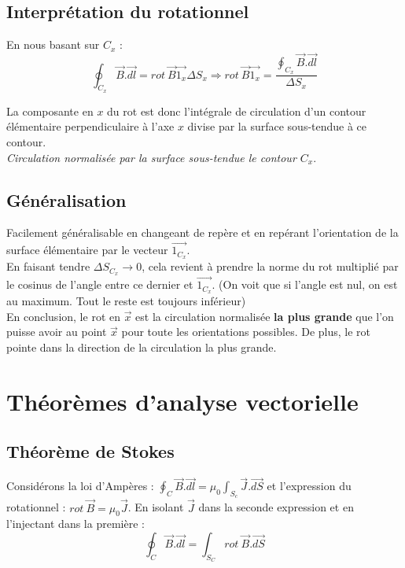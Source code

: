 \documentclass	[11pt, a4paper, openany]{book}
\begin{document}
\subsection{Interprétation du rotationnel}
En nous basant sur $C_x$ :
\begin{equation}
	\oint_{C_x} \vec{B}.\vec{dl} = rot\ \vec{B}\vec{1_x}\Delta S_x \Rightarrow rot\ \vec{B}\vec{1_x} = \frac{\oint_{C_x} \vec{B}.\vec{dl}}{\Delta S_x}
\end{equation}

La composante en $x$ du rot est donc l'intégrale de circulation d'un contour élémentaire perpendiculaire à l'axe $x$ divise par la surface sous-tendue à ce contour.\\
\textit{Circulation normalisée par la surface sous-tendue le contour $C_x$}.

\subsection{Généralisation }
Facilement généralisable en changeant de repère et en repérant l'orientation de la surface élémentaire par le vecteur $\vec{1_{C_x}}$.\\

En faisant tendre $\Delta S_{C_x} \rightarrow 0$, cela revient à prendre la norme du rot multiplié par le cosinus de l'angle entre ce dernier et $\vec{1_{C_x}}$. (On voit que si l'angle est nul, on est au maximum. Tout le reste est toujours inférieur)\\

En conclusion, le rot en $\vec{x}$ est la circulation normalisée \textbf{la plus grande} que l'on puisse avoir au point $\vec{x}$ pour toute les orientations possibles. De plus, le rot pointe dans la direction de la circulation la plus grande. 

\section{Théorèmes d'analyse vectorielle}
\subsection{Théorème de Stokes}
Considérons la loi d'Ampères : $\oint_C \vec{B}.\vec{dl} = \mu_0 \int_{S_c} \vec{J}.\vec{dS}$ et l'expression du rotationnel : $rot\ \vec{B} = \mu_0\vec{J}$. En isolant $\vec{J}$ dans la seconde expression et en l'injectant dans la première :
\begin{equation}
	\oint_C \vec{B}.\vec{dl} = \int_{S_C} rot\ \vec{B}.\vec{dS}
\end{equation}
\end{document}
